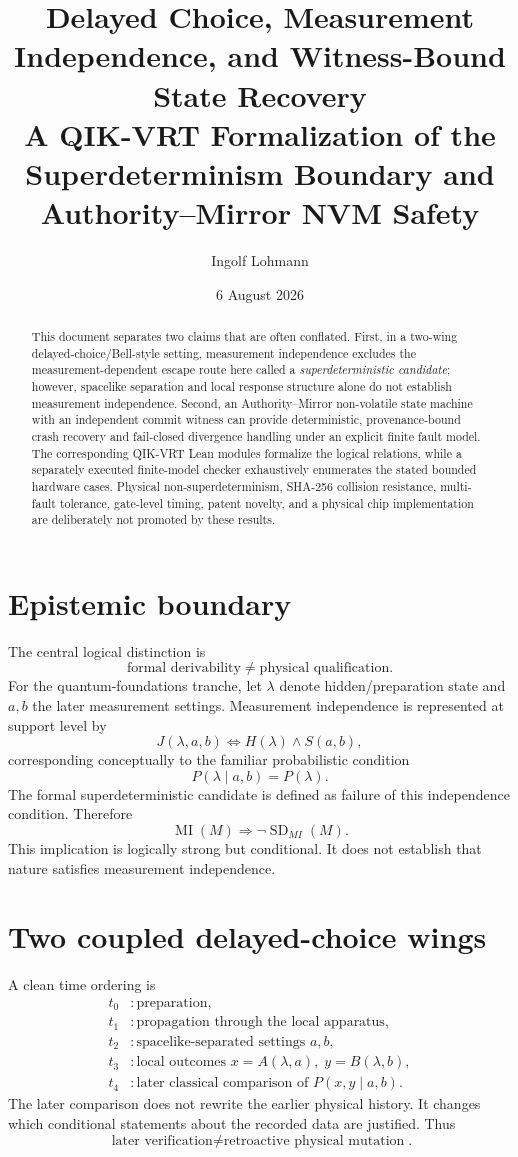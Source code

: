 \documentclass[11pt,a4paper]{article}
\title{Delayed Choice, Measurement Independence, and Witness-Bound State Recovery\\\large A QIK-VRT Formalization of the Superdeterminism Boundary and Authority--Mirror NVM Safety}
\author{Ingolf Lohmann}
\date{6 August 2026}
\begin{document}
\maketitle

\begin{abstract}
This document separates two claims that are often conflated. First, in a two-wing delayed-choice/Bell-style setting, measurement independence excludes the measurement-dependent escape route here called a \emph{superdeterministic candidate}; however, spacelike separation and local response structure alone do not establish measurement independence. Second, an Authority--Mirror non-volatile state machine with an independent commit witness can provide deterministic, provenance-bound crash recovery and fail-closed divergence handling under an explicit finite fault model. The corresponding QIK-VRT Lean modules formalize the logical relations, while a separately executed finite-model checker exhaustively enumerates the stated bounded hardware cases. Physical non-superdeterminism, SHA-256 collision resistance, multi-fault tolerance, gate-level timing, patent novelty, and a physical chip implementation are deliberately not promoted by these results.
\end{abstract}

\section{Epistemic boundary}
The central logical distinction is
\[
\text{formal derivability}\neq\text{physical qualification}.
\]
For the quantum-foundations tranche, let $\lambda$ denote hidden/preparation state and $a,b$ the later measurement settings. Measurement independence is represented at support level by
\[
J(\lambda,a,b)\iff H(\lambda)\land S(a,b),
\]
corresponding conceptually to the familiar probabilistic condition
\[
P(\lambda\mid a,b)=P(\lambda).
\]
The formal superdeterministic candidate is defined as failure of this independence condition. Therefore
\[
\boxed{\operatorname{MI}(M)\Rightarrow \neg\operatorname{SD}_{MI}(M)}.
\]
This implication is logically strong but conditional. It does not establish that nature satisfies measurement independence.

\section{Two coupled delayed-choice wings}
A clean time ordering is
\begin{align*}
t_0 &: \text{preparation},\\
t_1 &: \text{propagation through the local apparatus},\\
t_2 &: \text{spacelike-separated settings }a,b,\\
t_3 &: \text{local outcomes }x=A(\lambda,a),\;y=B(\lambda,b),\\
t_4 &: \text{later classical comparison of }P(x,y\mid a,b).
\end{align*}
The later comparison does not rewrite the earlier physical history. It changes which conditional statements about the recorded data are justified. Thus
\[
\boxed{\text{later verification}\neq\text{retroactive physical mutation}}.
\]
\end{document}
